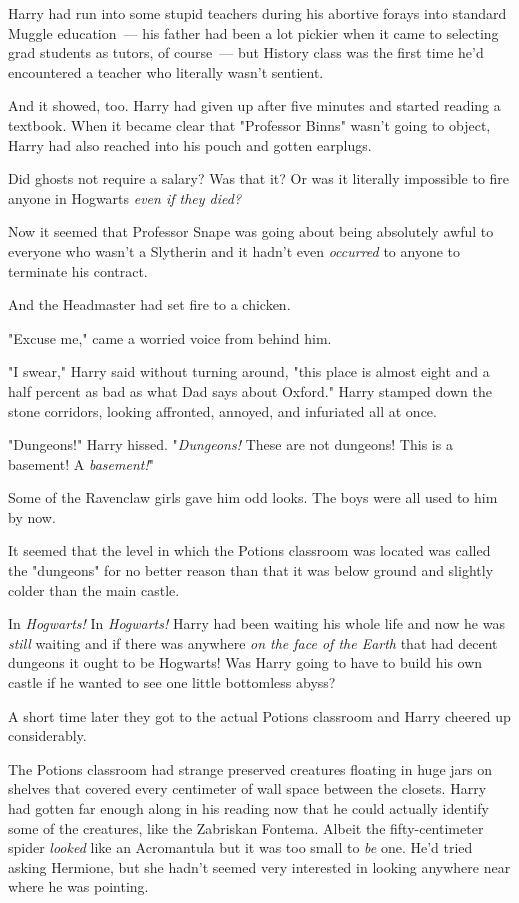 Harry had run into some stupid teachers during his abortive forays into
standard Muggle education~--- his father had been a lot pickier when it came to
selecting grad students as tutors, of course~--- but History class was the first
time he'd encountered a teacher who literally wasn't sentient.

And it showed, too. Harry had given up after five minutes and started reading a
textbook. When it became clear that "Professor Binns" wasn't going to object,
Harry had also reached into his pouch and gotten earplugs.

Did ghosts not require a salary? Was that it? Or was it literally impossible to
fire anyone in Hogwarts \emph{even if they died?}

Now it seemed that Professor Snape was going about being absolutely awful to
everyone who wasn't a Slytherin and it hadn't even \emph{occurred} to anyone to
terminate his contract.

And the Headmaster had set fire to a chicken.

"Excuse me," came a worried voice from behind him.

"I swear," Harry said without turning around, "this place is almost eight and a
half percent as bad as what Dad says about Oxford."
\sbreak
Harry stamped down the stone corridors, looking affronted, annoyed, and
infuriated all at once.

"Dungeons!" Harry hissed. "\emph{Dungeons!}  These are not dungeons! This is a
basement! A \emph{basement!}"

Some of the Ravenclaw girls gave him odd looks. The boys were all used to him
by now.

It seemed that the level in which the Potions classroom was located was called
the "dungeons" for no better reason than that it was below ground and slightly
colder than the main castle.

In \emph{Hogwarts!} In \emph{Hogwarts!} Harry had been waiting his whole life
and now he was \emph{still} waiting and if there was anywhere \emph{on the face
of the Earth} that had decent dungeons it ought to be Hogwarts! Was Harry going
to have to build his own castle if he wanted to see one little bottomless abyss?

A short time later they got to the actual Potions classroom and Harry cheered
up considerably.

The Potions classroom had strange preserved creatures floating in huge jars on
shelves that covered every centimeter of wall space between the closets. Harry
had gotten far enough along in his reading now that he could actually identify
some of the creatures, like the Zabriskan Fontema. Albeit the fifty-centimeter
spider \emph{looked} like an Acromantula but it was too small to \emph{be} one.
He'd tried asking Hermione, but she hadn't seemed very interested in looking
anywhere near where he was pointing.

